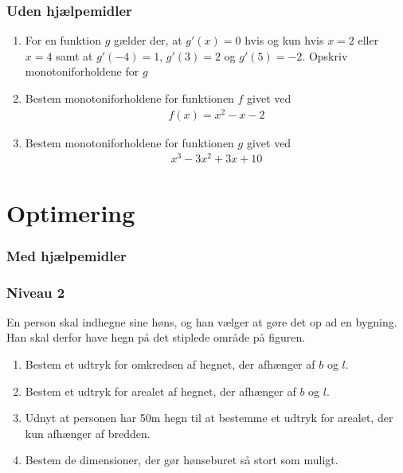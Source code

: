 \subsubsection*{Uden hjælpemidler}
\begin{enumerate}[label=\roman*)]
	\item For en funktion $g$ gælder der, at $g'(x) = 0$ hvis og kun hvis $x = 2$ eller $x = 4$ samt at $g'(-4) = 1$, $g'(3) = 2$ og $g'(5) = -2$.   
	Opskriv monotoniforholdene for $g$	
	\item Bestem monotoniforholdene for funktionen $f$ givet ved
	\begin{align*}
		f(x) = x^2 -x - 2
	\end{align*}
	\item Bestem monotoniforholdene for funktionen $g$ givet ved
	\begin{align*}
		x^3 - 3x^2 + 3x + 10
	\end{align*}

\end{enumerate}
\newpage


\section*{Optimering }
\subsubsection*{Med hjælpemidler}

\subsubsection*{Niveau 2}
En person skal indhegne sine høns, og han vælger at gøre det op ad en bygning. Han skal derfor have hegn på det stiplede område på figuren. 
\begin{enumerate}[label=\roman*)]
	\item Bestem et udtryk for omkredsen af hegnet, der afhænger af $b$ og $l$.
	\item Bestem et udtryk for arealet af hegnet, der afhænger af $b$ og $l$. 
	\item Udnyt at personen har 50m hegn til at bestemme et udtryk for arealet, der kun afhænger af bredden.
	\item Bestem de dimensioner, der gør hønseburet så stort som muligt. 
\end{enumerate}
\begin{center}
\end{center}
